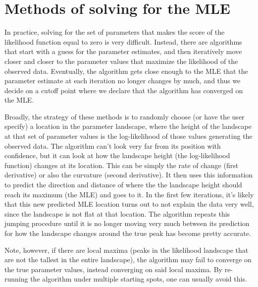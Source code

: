 \documentclass[12pt]{article}
\begin{document}
\section{Methods of solving for the MLE}
In practice, solving for the set of parameters that makes the score of the likelihood function equal to zero is very difficult.
Instead, there are algorithms that start with a guess for the parameter estimates, and then iteratively move closer and closer to the parameter values that maximize the likelihood of the observed data.
Eventually, the algorithm gets close enough to the MLE that the parameter estimate at each iteration no longer changes by much, and thus we decide on a cutoff point where we declare that the algorithm has converged on the MLE.

Broadly, the strategy of these methods is to randomly choose (or have the user specify) a location in the parameter landscape, where the height of the landscape at that set of parameter values is the log-likelihood of those values generating the observed data.
The algorithm can't look very far from its position with confidence, but it can look at how the landscape height (the log-likelihood function) changes at its location.
This can be simply the rate of change (first derivative) or also the curvature (second derivative).
It then uses this information to predict the direction and distance of where the the landscape height should reach its maximum (the MLE) and goes to it.
In the first few iterations, it's likely that this new predicted MLE location turns out to not explain the data very well, since the landscape is not flat at that location.
The algorithm  repeats this jumping procedure until it is no longer moving very much between its prediction for how the landscape changes around the true peak has become pretty accurate.

Note, however, if there are local maxima (peaks in the likelihood landscape that are not the tallest in the entire landscape), the algorithm may fail to converge on the true parameter values, instead converging on said local maxima.
By re-running the algorithm under multiple starting spots, one can usually avoid this.
\end{document}
